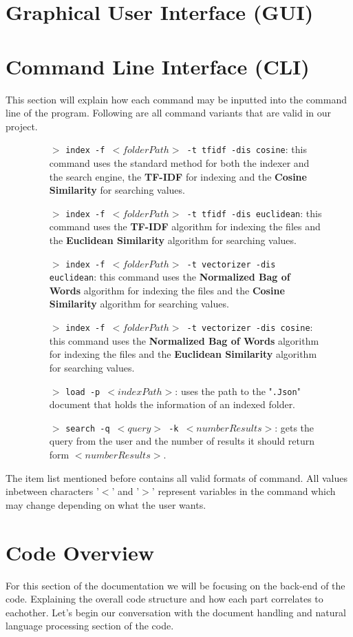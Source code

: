 \documentclass{article}
\begin{document}
\section{Graphical User Interface (GUI)}

\section{Command Line Interface (CLI)}
This section will explain how each command may be inputted into the command line of the program. Following are all command variants that are valid in our project.
\begin{figure}
    \begin{itemize}
        \item[$>$] \texttt{index -f $<folderPath>$ -t tfidf -dis cosine}: this command uses the standard method for both the indexer and the search engine, the \textbf{TF-IDF} for indexing and the \textbf{Cosine Similarity} for searching values. 
        \item[$>$] \texttt{index -f $<folderPath>$ -t tfidf -dis euclidean}: this command uses the \textbf{TF-IDF} algorithm for indexing the files and the \textbf{Euclidean Similarity} algorithm for searching values. 
        \item[$>$] \texttt{index -f $<folderPath>$ -t vectorizer -dis euclidean}: this command uses the \textbf{Normalized Bag of Words} algorithm for indexing the files and the \textbf{Cosine Similarity} algorithm for searching values. 
        \item[$>$] \texttt{index -f $<folderPath>$ -t vectorizer -dis cosine}: this command uses the \textbf{Normalized Bag of Words} algorithm for indexing the files and the \textbf{Euclidean Similarity} algorithm for searching values. 
        \item[$>$] \texttt{load -p $<indexPath>$}: uses the path to the "\texttt{.Json}" document that holds the information of an indexed folder.  
        \item[$>$] \texttt{search -q $<query>$ -k $<numberResults>$}: gets the query from the user and the number of results it should return form $<numberResults>$. 
    \end{itemize}
    \label{fig:Commands}
\end{figure}
The item list mentioned before contains all valid formats of command. All values inbetween characters '$<$' and '$>$' represent variables in the command which may change depending on what the user wants. 

\section{Code Overview}
For this section of the documentation we will be focusing on the back-end of the code. Explaining the overall code structure and how each part correlates to eachother. Let's begin our conversation with the document handling and natural language processing section of the code.
\end{document}
